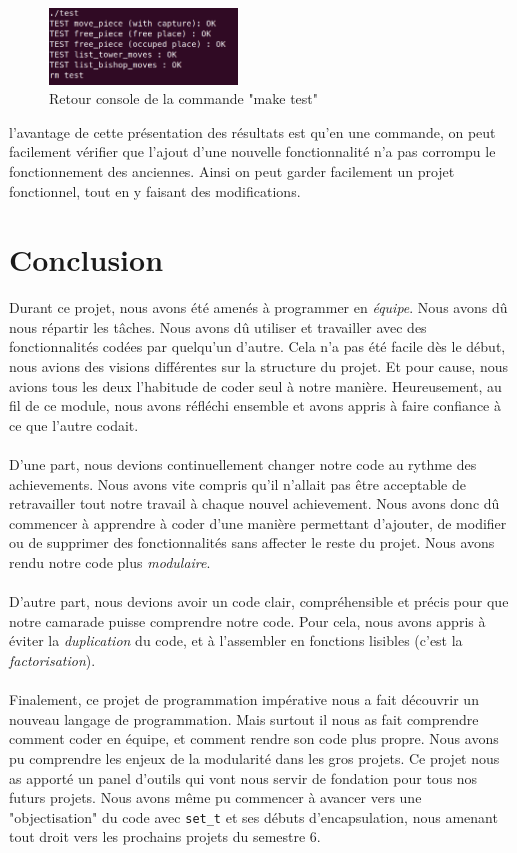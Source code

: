\documentclass{article}
\begin{document}
\begin{figure}[h]
    \centering
    \includegraphics[width=5cm]{maketest.png}
    \caption{Retour console de la commande "make test"}
    \label{test}
\end{figure}

l'avantage de cette présentation des résultats est qu'en une commande, on peut facilement vérifier que l'ajout d'une nouvelle fonctionnalité n'a pas corrompu le fonctionnement des anciennes. Ainsi on peut garder facilement un projet fonctionnel, tout en y faisant des modifications.

\newpage
\section{Conclusion} 

Durant ce projet, nous avons été amenés à programmer en \emph{équipe}.
Nous avons dû nous répartir les tâches.
Nous avons dû utiliser et travailler avec des fonctionnalités codées par quelqu'un d'autre.
Cela n'a pas été facile dès le début, nous avions des visions différentes sur la structure du projet.
Et pour cause, nous avions tous les deux l'habitude de coder seul à notre manière.
Heureusement, au fil de ce module, nous avons réfléchi ensemble et avons appris à faire confiance à ce que l'autre codait.
\\\\
D'une part, nous devions continuellement changer notre code au rythme des achievements.
Nous avons vite compris qu'il n'allait pas être acceptable de retravailler tout notre travail à chaque nouvel achievement.
Nous avons donc dû commencer à apprendre à coder d'une manière permettant d'ajouter, de modifier ou de supprimer des fonctionnalités sans affecter le reste du projet.
Nous avons rendu notre code plus \emph{modulaire}.
\\\\
D'autre part, nous devions avoir un code clair, compréhensible et précis pour que notre camarade puisse comprendre notre code.
Pour cela, nous avons appris à éviter la \emph{duplication} du code, et à l'assembler en fonctions lisibles (c'est la \emph{factorisation}).
\\\\
Finalement, ce projet de programmation impérative nous a fait découvrir un nouveau langage de programmation.
Mais surtout il nous as fait comprendre comment coder en équipe, et comment rendre son code plus propre.
Nous avons pu comprendre les enjeux de la modularité dans les gros projets.
Ce projet nous as apporté un panel d'outils qui vont nous servir de fondation pour tous nos futurs projets.
Nous avons même pu commencer à avancer vers une "objectisation" du code avec \lstinline{set_t} et ses débuts d'encapsulation, nous amenant tout droit vers les prochains projets du semestre 6.
\end{document}
